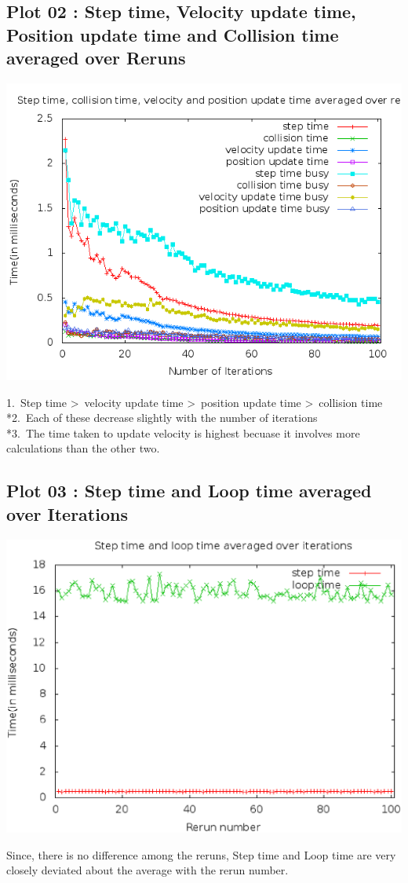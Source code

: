 \documentclass[10pt]{article}
\begin{document}
\subsection{Plot 02 : Step time, Velocity update time, Position update time and Collision time averaged over Reruns}
\begin{center}
\includegraphics[scale=0.4]{plot2}
\end{center}
1.\ Step time \textgreater \ velocity update time \textgreater \ position update time \textgreater \ collision time
\\*2.\ Each of these decrease slightly with the number of iterations
\\*3.\ The time taken to update velocity is highest becuase it involves more calculations than the other two.
\subsection{Plot 03 : Step time and Loop time averaged over Iterations}
\begin{center}
\includegraphics[scale=0.4]{plot3}
\end{center}
Since, there is no difference among the reruns, Step time and Loop time are very closely deviated about the average with the rerun number.
\end{document}
